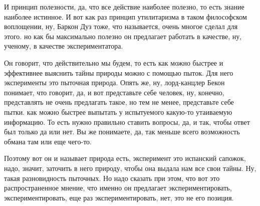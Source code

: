 И принцип полезности, да, что все действие наиболее
полезно, то есть знание наиболее истинное. И вот как раз принцип утилитаризма в
таком философском воплощении, ну, Баркон Дуз тоже, что называется, очень многое
сделал для этого. но как бы максимально полезно он предлагает работать в
качестве, ну, ученому, в качестве экспериментатора. 

Он говорит, что
действительно мы будем, то есть как можно быстрее и эффективнее выяснить тайны
природы можно с помощью пыток. Для него эксперименты это пыточная природа. Опять
же, ну, лорд-канцлер Бекон понимает, что говорит, да, и вот представьте себе
человек, ну, конечно, представлять не очень предлагать такое, но тем не менее,
представьте себе пытки. как можно быстрее выпытать у испытуемого какую-то
утаиваемую информацию. То есть нужно правильно ставить вопросы, да, и так, чтобы
ответ был только да или нет. Вы же понимаете, да, так меньше всего возможность
обмана там или еще чего-то. 

Поэтому вот он и называет природа есть, эксперимент
это испанский сапожок, надо, значит, заточить в него природу, чтобы она выдала
нам все свои тайны. Ну, такая разновидность пыточных. Но надо сказать при этом,
что вот это распространенное мнение, что именно он предлагает
экспериментировать, экспериментировать, еще раз экспериментировать, нет, это не
его позиция. 

